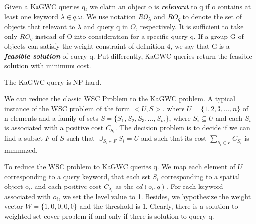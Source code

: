 Given a KaGWC queries q, we claim an object o is \textit{\textbf{relevant}} to q if o contains at least one keyword $\lambda \in q.\omega$. We use notation \textbf{$RO_\lambda$} and \textbf{$RO_q$} to denote the set of objects that relevant to $\lambda$ and query q in $O$, respectively. It is sufficient to take only $RO_q$ instead of O into consideration for a specific query q. If a group G of objects can satisfy the weight constraint of definition 4, we say that G is a \textit{\textbf{feasible solution}} of query q. Put differently, KaGWC queries return the feasible solution with minimum cost.

\noindent
\begin{thm}
    The KaGWC query is NP-hard.
    \begin{pot}
        We can reduce the classic WSC Problem to the KaGWC problem. A typical instance of the WSC problem of the form $<U,S>$, where  $U=\{1,2,3,...,n\}$ of n elements and a family of sets $S=\{S_1,S_2,S_3,...,S_m\}$, where $S_i \subseteq U$ and each $S_i$ is associated with a positive cost $C_{S_i}$. The decision problem is to decide if we can find a subset $F$ of $S$ such that $\cup_{S_i \in F}S_i=U$ and such that its cost $\sum_{S_i \in F}C_{S_i}$ is minimized.

        To reduce the WSC problem to KaGWC queries q. We map each element of $U$ corresponding to a query keyword, that each set $S_i$ corresponding to a spatial object $o_i$, and each positive cost $C_{S_i}$ as the $cd(o_i,q)$. For each keyword associated with $o_i$, we set the level value to 1. Besides, we hypothesize the weight vector $W=\{1,0,0,0,0\}$ and the threshold is 1. Clearly, there is a solution to weighted set cover problem if and only if there is solution to query q.
    \end{pot}
\end{thm}


